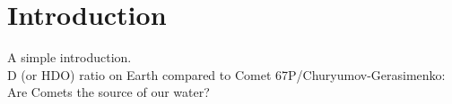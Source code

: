 
\section{Introduction}
A simple introduction.\\

D (or HDO) ratio on Earth compared to Comet 67P/Churyumov-Gerasimenko: Are Comets the source of our water?